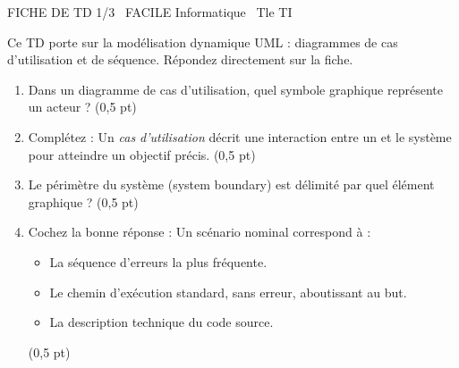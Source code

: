 \documentclass[11pt]{article}
\begin{document}
\begin{tcolorbox}[enhanced,colback=popink,colframe=popink,arc=10pt,boxrule=0pt,left=12pt,right=12pt,top=9pt,bottom=9pt]
{\color{white}\popxbold\small FICHE DE TD 1/3 \textbullet\ FACILE \hfill Informatique \textbullet\ Tle TI\par}
\end{tcolorbox}
\vspace{4pt}
Ce TD porte sur la modélisation dynamique UML : diagrammes de cas d'utilisation et de séquence. Répondez directement sur la fiche.

\begin{exercice}
\begin{enumerate}
    \item Dans un diagramme de cas d'utilisation, quel symbole graphique représente un acteur ? \hfill (0,5 pt)
    \item Complétez : Un \textit{cas d'utilisation} décrit une interaction entre un \underline{\hspace{3cm}} et le système pour atteindre un objectif précis. \hfill (0,5 pt)
    \item Le périmètre du système (system boundary) est délimité par quel élément graphique ? \hfill (0,5 pt)
    \item Cochez la bonne réponse : Un scénario nominal correspond à :
\begin{itemize}
        \item[$\square$] La séquence d'erreurs la plus fréquente.
        \item[$\square$] Le chemin d'exécution standard, sans erreur, aboutissant au but.
        \item[$\square$] La description technique du code source.
    \end{itemize}
    \hfill (0,5 pt)
\end{enumerate}
\end{exercice}
\end{document}
